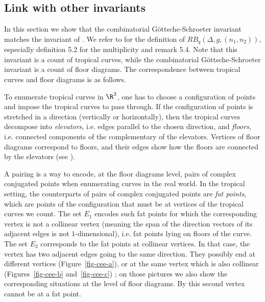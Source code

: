 \subsection{Link with other invariants}

In this section we show that the combinatorial Göttsche-Schroeter invariant matches the invariant of \cite[Theorem 5.8]{shustin-2024-refined}. 
We refer to \cite[Section~5]{shustin-2024-refined} for the definition of $RB_q(\Delta,g,(n_1,n_2))$, especially definition 5.2 for the multiplicity and remark 5.4. Note that this invariant is a count of tropical curves, while the combinatorial Göttsche-Schroeter invariant is a count of floor diagrams. The correspondence between tropical curves and floor diagrams is as follows.


To enumerate tropical curves in $\R^2$, one has to choose a configuration of points and impose the tropical curves to pass through. If the configuration of points is stretched in a direction (vertically or horizontally), then the tropical curves decompose into \emph{elevators}, i.e.  edges parallel to the chosen direction, and \emph{floors}, i.e.  connected components of the complementary of the elevators. Vertices of floor diagrams correspond to floors, and their edges show how the floors are connected by the elevators (see \cite{brugalle_floor_2008}).


A pairing is a way to encode, at the floor diagrams level, pairs of complex conjugated points when enumerating curves in the real world. In the tropical setting, the counterparts of pairs of complex conjugated points are \emph{fat points}, which are points of the configuration that must be at vertices of the tropical curves we count. 
The set $E_1$ encodes such fat points for which the corresponding vertex is not a collinear vertex (meaning the span of the direction vectors of its adjacent edges is not $1$-dimensional), i.e.  fat points lying on floors of the curve. 
The set $E_2$ corresponds to the fat points at collinear vertices. In that case, the vertex has two adjacent edges going to the same direction. They possibly end at different vertices (Figure~\ref{fig-cee-a}), or at the same vertex which is also collinear (Figures~\ref{fig-cee-b} and~\ref{fig-cee-c}) ; on those pictures we also show the corresponding situations at the level of floor diagrams. By \cite[Lemma 4.6]{shustin-2024-refined} this second vertex cannot be at a fat point.


